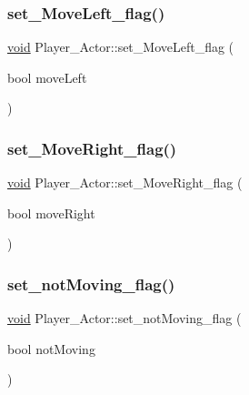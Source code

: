 \mbox{\label{classPlayer__Actor_ab31f55f4dd9643979ccaf15a939a1d9e}} 
\subsubsection{\texorpdfstring{set\+\_\+\+Move\+Left\+\_\+flag()}{set\_MoveLeft\_flag()}}
{\footnotesize\ttfamily \hyperlink{imgui__impl__opengl3__loader_8h_ac668e7cffd9e2e9cfee428b9b2f34fa7}{void} Player\+\_\+\+Actor\+::set\+\_\+\+Move\+Left\+\_\+flag (\begin{DoxyParamCaption}\item[{bool}]{move\+Left }\end{DoxyParamCaption})\hspace{0.3cm}{\ttfamily [inline]}}

\mbox{\label{classPlayer__Actor_acf7e3e4c67e48826e77d67ec5415606e}} 
\subsubsection{\texorpdfstring{set\+\_\+\+Move\+Right\+\_\+flag()}{set\_MoveRight\_flag()}}
{\footnotesize\ttfamily \hyperlink{imgui__impl__opengl3__loader_8h_ac668e7cffd9e2e9cfee428b9b2f34fa7}{void} Player\+\_\+\+Actor\+::set\+\_\+\+Move\+Right\+\_\+flag (\begin{DoxyParamCaption}\item[{bool}]{move\+Right }\end{DoxyParamCaption})\hspace{0.3cm}{\ttfamily [inline]}}

\mbox{\label{classPlayer__Actor_a97eb58ecad6e2543e620f3639d0566c5}} 
\subsubsection{\texorpdfstring{set\+\_\+not\+Moving\+\_\+flag()}{set\_notMoving\_flag()}}
{\footnotesize\ttfamily \hyperlink{imgui__impl__opengl3__loader_8h_ac668e7cffd9e2e9cfee428b9b2f34fa7}{void} Player\+\_\+\+Actor\+::set\+\_\+not\+Moving\+\_\+flag (\begin{DoxyParamCaption}\item[{bool}]{not\+Moving }\end{DoxyParamCaption})\hspace{0.3cm}{\ttfamily [inline]}}

